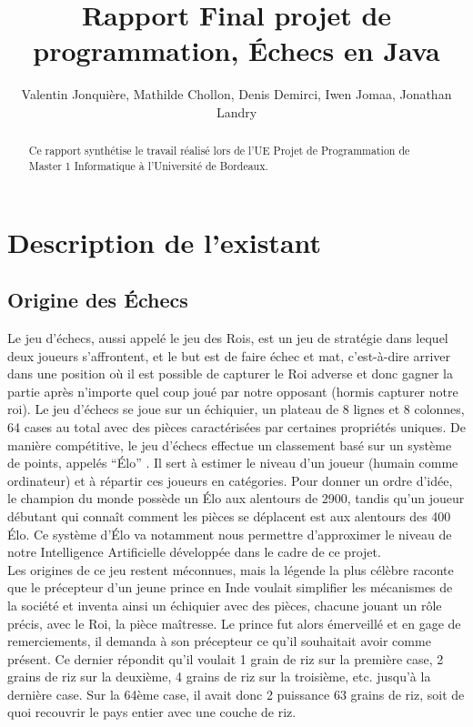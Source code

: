\documentclass{article}
\author{
    Valentin Jonquière,
    Mathilde Chollon,
    Denis Demirci,
    Iwen Jomaa,
    Jonathan Landry
}
\title{Rapport Final projet de programmation, Échecs en Java}
\begin{document}
\maketitle

\pagebreak

\tableofcontents

\pagebreak
\begin{abstract}
    Ce rapport synthétise le travail réalisé lors de l'UE Projet de Programmation de Master 1 Informatique à l'Université de Bordeaux.
 \end{abstract}

\section{Description de l'existant}
\subsection{Origine des Échecs}
Le jeu d’échecs, aussi appelé le jeu des Rois, est un jeu de stratégie dans lequel deux joueurs s’affrontent,
et le but est de faire échec et mat, c’est-à-dire arriver dans une position où il est possible de capturer
le Roi adverse et donc gagner la partie après n’importe quel coup joué par notre opposant (hormis capturer notre roi).
Le jeu d’échecs se joue sur un échiquier, un plateau de 8 lignes et 8 colonnes, 64 cases au total avec des pièces
caractérisées par certaines propriétés uniques. De manière compétitive, le jeu d'échecs effectue un classement
basé sur un système de points, appelés ``Élo'' \cite{elo}. Il sert à estimer le niveau d'un joueur (humain comme ordinateur) et
à répartir ces joueurs en catégories. Pour donner un ordre d'idée, le champion du monde possède un Élo aux alentours de 2900,
tandis qu'un joueur débutant qui connaît comment les pièces se déplacent est aux alentours des 400 Élo. Ce système d'Élo
va notamment nous permettre d'approximer le niveau de notre Intelligence Artificielle développée dans le cadre de ce projet.\\
Les origines de ce jeu restent méconnues, mais la légende la plus célèbre raconte que le précepteur d’un jeune prince en Inde
voulait simplifier les mécanismes de la société et inventa ainsi un échiquier avec des pièces, chacune jouant un rôle précis,
avec le Roi, la pièce maîtresse. Le prince fut alors émerveillé et en gage de remerciements, il demanda à son précepteur ce
qu’il souhaitait avoir comme présent. Ce dernier répondit qu’il voulait 1 grain de riz sur la première case, 2 grains de riz
sur la deuxième, 4 grains de riz sur la troisième, etc. jusqu’à la dernière case. Sur la 64ème case, il avait donc
2 puissance 63 grains de riz, soit de quoi recouvrir le pays entier avec une couche de riz.
\end{document}
